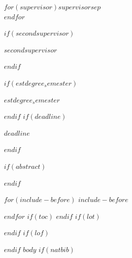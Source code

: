 \documentclass[$if(fontsize)$$fontsize$,$endif$$if(lang)$$lang$,$endif$$if(papersize)$$papersize$,$endif$$for(classoption)$$classoption$$sep$,$endfor$]{$documentclass$}
\begin{document}
\begin{titlepage}
  \noindent\begin{minipage}[t]{0.34\textwidth}
\end{minipage}
\begin{minipage}[t]{0.63\textwidth}
$for(supervisor)$$supervisor$$sep$\\[0.1em]$endfor$
\end{minipage}

$if(secondsupervisor)$
  \noindent\begin{minipage}[t]{0.5\textwidth}
  \end{minipage}
  \begin{minipage}[t]{0.7\textwidth}
  \hspace{1cm}$secondsupervisor$
  \end{minipage}

$endif$

$if(estdegree_semester)$
  \noindent\begin{minipage}[t]{0.5\textwidth}
  \end{minipage}
  \begin{minipage}[t]{0.7\textwidth}
  \hspace{1cm}$estdegree_semester$
  \end{minipage}

$endif$
$if(deadline)$
\vspace{0.5cm}
\noindent\begin{minipage}[t]{0.34\textwidth}
\end{minipage}
\begin{minipage}[t]{0.63\textwidth}
$deadline$
\end{minipage}
$endif$

\end{titlepage}

\restoregeometry

$if(abstract)$
\begin{abstract}
$abstract$
\end{abstract}
$endif$

$for(include-before)$
$include-before$

$endfor$
$if(toc)$
{
\hypersetup{linkcolor=black}
\setcounter{tocdepth}{$toc-depth$}
\tableofcontents
}
$endif$
$if(lot)$
\newpage
\listoftables
$endif$
$if(lof)$
\newpage
\listoffigures
$endif$
\newpage
{} 
$body$
$if(natbib)$
\end{document}
